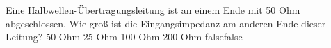     {Eine Halbwellen-Übertragungsleitung ist an einem Ende mit 50 Ohm abgeschlossen. Wie groß ist die Eingangsimpedanz am anderen Ende dieser Leitung?}
    {50 Ohm}
    {25 Ohm}
    {100 Ohm}
    {200 Ohm}
    {false}{false}